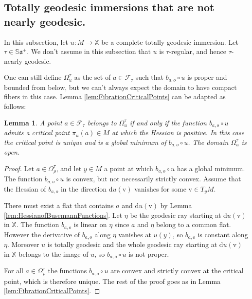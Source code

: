 \documentclass[reqno,10pt]{amsart}
\theoremstyle{plain}
\newtheorem{lem}[thm]{Lemma}
\theoremstyle{definition}
\theoremstyle{remark}
\newcommand{\type}{\tau}
\newcommand{\Sph}{\mathbb{S}}
\newcommand{\X}{\mathbb{X}}
\begin{document}
\subsection{Totally geodesic immersions that are not nearly geodesic.}

In this subsection, let $u:M\to \X$ be a complete totally geodesic immersion. Let $\type\in \Sph\mathfrak{a}^+$. We don't assume in this subsection that $u$ is $\type$-regular, and hence $\type$-nearly geodesic. 

\medskip

One can still define $\Omega_u^\type$ as the set of $a\in \mathcal{F}_\type$ such that $b_{a,o}\circ u$ is proper and bounded from below, but we can't always expect the domain to have compact fibers in this case. Lemma \ref{lem:FibrationCriticalPoints} can be adapted as follows:

\begin{lem}
\label{lem:TotallyGeodesicDoD}
A point $a\in\mathcal{F}_\type$ belongs to $\Omega^\type_u$ if and only if the function $b_{a,o}\circ u$ admits a critical point $\pi_u(a)\in M$ at which the Hessian is positive. In this case the critical point is unique and is a global minimum of $b_{a,o}\circ u$. The domain $\Omega^\type_u$ is open.
\end{lem}

\begin{proof}
Let $a\in \Omega^\type_\rho$, and let $y\in M$ a point at which $b_{a,o}\circ u$ has a global minimum. The function $b_{a,o}\circ u$ is convex, but not necessarily strictly convex. Assume that the Hessian of $b_{a,o}$ in the direction $\mathrm{d}u(\mathrm{v})$ vanishes for some $\mathrm{v}\in T_yM$.

\medskip

There must exist a flat that contains $a$ and $\mathrm{d}u(\mathrm{v})$ by Lemma \ref{lem:HessianofBusemannFunctions}. Let $\eta$ be the  geodesic ray starting at $\mathrm{d}u(\mathrm{v})$ in $\X$. The function $b_{a,o}$ is linear on $\eta$ since $a$ and $\eta$ belong to a common flat. However the derivative of $b_{a,o}$ along $\eta$ vanishes at $u(y)$, so $b_{a,o}$ is constant along $\eta$. Moreover $u$ is totally geodesic and the whole geodesic ray starting at $\mathrm{d}u(\mathrm{v})$ in $\X$ belongs to the image of $u$, so $b_{a,o}\circ u$ is not proper.

\medskip

For all $a\in \Omega^\type_\rho$ the functions $b_{a,o}\circ u$ are convex and strictly convex at the critical point, which is therefore unique. The rest of the proof goes as in Lemma \ref{lem:FibrationCriticalPoints}.
\end{proof}
\end{document}
